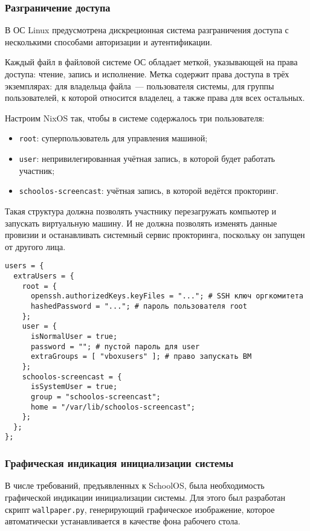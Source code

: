 \subsubsection{Разграничение доступа}

В ОС Linux предусмотрена дискреционная система разграничения доступа с несколькими способами авторизации и аутентификации.

Каждый файл в файловой системе ОС обладает меткой, указывающей на права доступа: чтение, запись и исполнение. Метка содержит права доступа в трёх экземплярах: для владельца файла~--- пользователя системы, для группы пользователей, к которой относится владелец, а также права для всех остальных.

Настроим NixOS так, чтобы в системе содержалось три пользователя:
\begin{itemize}
\item \texttt{root}: суперпользователь для управления машиной;
\item \texttt{user}: непривилегированная учётная запись, в которой будет работать участник;
\item \texttt{schoolos-screencast}: учётная запись, в которой ведётся прокторинг.
\end{itemize}

Такая структура должна позволять участнику перезагружать компьютер и запускать виртуальную машину. И не должна позволять изменять данные провизии и останавливать системный сервис прокторинга, поскольку он запущен от другого лица.

\begin{lstlisting}[caption={Конфигурация разграничения доступа}]
users = {
  extraUsers = {
    root = {
      openssh.authorizedKeys.keyFiles = "..."; # SSH ключ оргкомитета
      hashedPassword = "..."; # пароль пользователя root
    };
    user = {
      isNormalUser = true;
      password = ""; # пустой пароль для user
      extraGroups = [ "vboxusers" ]; # право запускать ВМ
    };
    schoolos-screencast = {
      isSystemUser = true;
      group = "schoolos-screencast";
      home = "/var/lib/schoolos-screencast";
    };
  };
};
\end{lstlisting}

\subsubsection{Графическая индикация инициализации системы}

В числе требований, предъявленных к SchoolOS, была необходимость графической индикации инициализации системы. Для этого был разработан скрипт \texttt{wallpaper.py}, генерирующий графическое изображение, которое автоматически устанавливается в качестве фона рабочего стола.

